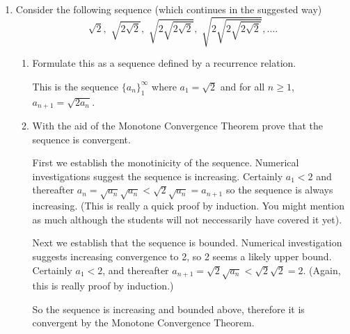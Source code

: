 \documentclass[oneside,10pt]{amsart}
\begin{document}
\begin{enumerate}
\begin{enumerate}
    $\left \{ f_n \right \}_{n=1}^\infty$, where $f_n = \frac{\cos{(3n)}}{n^{1/3}     + 1}$.
    \begin{solution}{
    This questions requires the use of the Squeeze Theorem (not in the notes, but I will present it in the lectures) First we use the boundedness of the cosine function to say
    $$\frac{-1}{n^{1/3} +1} \leq f_n \leq \frac{1}{n^{1/3} +1}.$$
    Then we notice that the sequences at the ends of this inequality both coverge to zero as the denominators are increasing and unbounded. Therefore by the Squeeze Theorem $f_n \to 0$ as $n \to \infty$.
    }\end{solution}
    \end{enumerate}
    Confirm your results by comparing to computer plots of the sequences. \comp
\item
Consider the following sequence (which continues in the suggested way)
$$ \sqrt{2}, \,\, \sqrt{2\sqrt{2}}, \,\, \sqrt{2\sqrt{2\sqrt{2}}}, \,\,  \sqrt{2\sqrt{2\sqrt{2\sqrt{2}}}}, \dots .$$
    \begin{enumerate}
    \item
    Formulate this as a sequence defined by a recurrence relation.
    \begin{solution}{This is the sequence $\{a_n\}_1^\infty$ where $a_1 = \sqrt{2}$ and for all $n\geq 1$, $a_{n+1} = \sqrt{2a_n}$.}\end{solution}
    \item
    With the aid of the Monotone Convergence Theorem prove that the sequence is convergent.
    \begin{solution}{First we establish the monotinicity of the sequence. Numerical investigations suggest the sequence is increasing. Certainly $a_1 < 2$ and thereafter $a_n = \sqrt{a_n}\sqrt{a_n} < \sqrt{2} \sqrt{a_n} = a_{n+1}$ so the sequence is always increasing. (This is really a quick proof by induction. You might mention as much although the students will not neccessarily have covered it yet).

    Next we establish that the sequence is bounded. Numerical investigation suggests increasing convergence to 2, so 2 seems a likely upper bound. Certainly $a_1 < 2$, and thereafter $a_{n+1} = \sqrt{2} \sqrt{a_n} < \sqrt{2} \sqrt{2} = 2$. (Again, this is really proof by induction.)

    So the sequence is increasing and bounded above, therefore it is convergent by the Monotone Convergence Theorem.
    }\end{solution}


\end{enumerate}
\end{enumerate}
\end{document}
